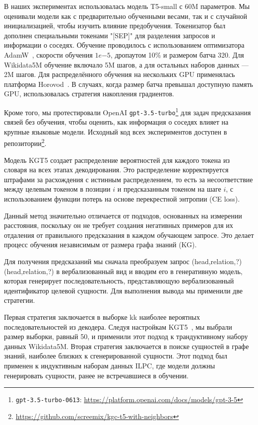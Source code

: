 В наших экспериментах использовалась модель T5-small с 60M параметров. Мы оценивали модели как с предварительно обученными весами, так и с случайной инициализацией, чтобы изучить влияние предобучения. Токенизатор был дополнен специальными токенами "[SEP]" для разделения запросов и информации о соседях. Обучение проводилось с использованием оптимизатора AdamW~\cite{loshchilov2018adamw}, скорости обучения \(1e{-5}\), дропаутом 10\% и размером батча 320. Для Wikidata5M обучение включало 5M шагов, а для остальных наборов данных — 2M шагов. Для распределённого обучения на нескольких GPU применялась платформа Horovod~\cite{horovod}. В случаях, когда размер батча превышал доступную память GPU, использовалась стратегия накопления градиентов.

Кроме того, мы протестировали OpenAI \texttt{gpt-3.5-turbo}\footnote{\texttt{gpt-3.5-turbo-0613}: \url{https://platform.openai.com/docs/models/gpt-3-5}} для задач предсказания связей без обучения, чтобы оценить, как информация о соседях влияет на крупные языковые модели. Исходный код всех экспериментов доступен в репозитории\footnote{\url{https://github.com/screemix/kgc-t5-with-neighbors}}.  
\label{sec:training}

Модель KGT5 создает распределение вероятностей для каждого токена из словаря на всех этапах декодирования. Это распределение корректируется штрафами за расхождения с истинным распределением, то есть за несоответствие между целевым токеном в позиции $i$ и предсказанным токеном на шаге $i$, с использованием функции потерь на основе перекрестной энтропии (CE loss).

Данный метод значительно отличается от подходов, основанных на измерении расстояния, поскольку он не требует создания негативных примеров для их отдаления от правильного предсказания в каждом обучающем запросе. Это делает процесс обучения независимым от размера графа знаний (KG).

Для получения предсказаний мы сначала преобразуем запрос (head,relation,?)(head,relation,?) в вербализованный вид и вводим его в генеративную модель, которая генерирует последовательность, представляющую вербализованный идентификатор целевой сущности. Для выполнения вывода мы применили две стратегии.

Первая стратегия заключается в выборке kk наиболее вероятных последовательностей из декодера. Следуя настройкам KGT5~\cite{kgt5}, мы выбрали размер выборки, равный 50, и применили этот подход к трандуктивному набору данных Wikidata5M. Вторая стратегия заключается в поиске сущностей в графе знаний, наиболее близких к сгенерированной сущности. Этот подход был применен к индуктивным наборам данных ILPC, где модели должны генерировать сущности, ранее не встречавшиеся в обучении.

